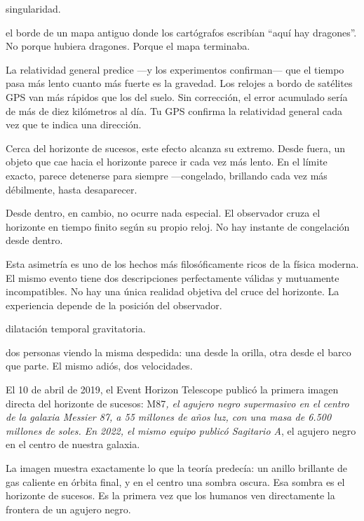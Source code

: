 \begin{fisica}
 singularidad.

 el borde de un mapa antiguo donde los cartógrafos escribían “aquí hay dragones”. No porque hubiera dragones. Porque el mapa terminaba.
\end{fisica}
\noindent La relatividad general predice —y los experimentos confirman— que el tiempo pasa más lento cuanto más fuerte es la gravedad. Los relojes a bordo de satélites GPS van más rápidos que los del suelo. Sin corrección, el error acumulado sería de más de diez kilómetros al día. Tu GPS confirma la relatividad general cada vez que te indica una dirección.

Cerca del horizonte de sucesos, este efecto alcanza su extremo. Desde fuera, un objeto que cae hacia el horizonte parece ir cada vez más lento. En el límite exacto, parece detenerse para siempre —congelado, brillando cada vez más débilmente, hasta desaparecer.

Desde dentro, en cambio, no ocurre nada especial. El observador cruza el horizonte en tiempo finito según su propio reloj. No hay instante de congelación desde dentro.

Esta asimetría es uno de los hechos más filosóficamente ricos de la física moderna. El mismo evento tiene dos descripciones perfectamente válidas y mutuamente incompatibles. No hay una única realidad objetiva del cruce del horizonte. La experiencia depende de la posición del observador.

\begin{fisica}
 dilatación temporal gravitatoria.

 dos personas viendo la misma despedida: una desde la orilla, otra desde el barco que parte. El mismo adiós, dos velocidades.
\end{fisica}
\noindent El 10 de abril de 2019, el Event Horizon Telescope publicó la primera imagen directa del horizonte de sucesos: M87\emph{, el agujero negro supermasivo en el centro de la galaxia Messier 87, a 55 millones de años luz, con una masa de 6.500 millones de soles. En 2022, el mismo equipo publicó Sagitario A}, el agujero negro en el centro de nuestra galaxia.

La imagen muestra exactamente lo que la teoría predecía: un anillo brillante de gas caliente en órbita final, y en el centro una sombra oscura. Esa sombra es el horizonte de sucesos. Es la primera vez que los humanos ven directamente la frontera de un agujero negro.

